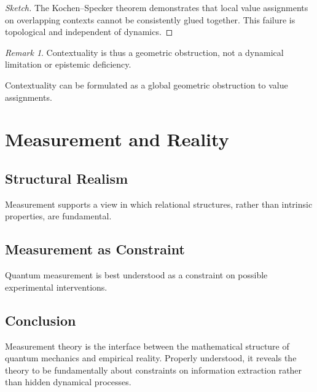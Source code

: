 \documentclass[12pt]{book}
\theoremstyle{plain}
\theoremstyle{definition}
\theoremstyle{remark}
\newtheorem{remark}[theorem]{Remark}
\begin{document}
\begin{proof}[Sketch]
The Kochen--Specker theorem demonstrates that local value assignments on overlapping contexts cannot be consistently glued together. This failure is topological and independent of dynamics.
\end{proof}

\begin{remark}
Contextuality is thus a geometric obstruction, not a dynamical limitation or epistemic deficiency.
\end{remark}
Contextuality can be formulated as a global geometric obstruction to value assignments.

\part{Measurement and Reality}

\chapter{Structural Realism}
Measurement supports a view in which relational structures, rather than intrinsic properties, are fundamental.

\chapter{Measurement as Constraint}
Quantum measurement is best understood as a constraint on possible experimental interventions.

\backmatter

\chapter*{Conclusion}
Measurement theory is the interface between the mathematical structure of quantum mechanics and empirical reality. Properly understood, it reveals the theory to be fundamentally about constraints on information extraction rather than hidden dynamical processes.
\end{document}
